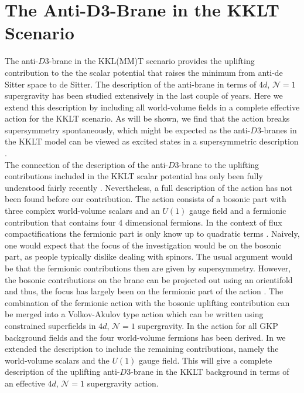 \documentclass[a4paper,12pt,twoside,openright]{report}
\begin{document}
\section[The Anti-$D3$-Brane in the KKLT Scenario]{The Anti-$\mathbf{D3}$-Brane in the KKLT Scenario}
\label{sec:D3barKKLTmain}
The anti-$D3$-brane in the KKL(MM)T scenario \cite{Kachru:2003aw,Kachru:2003sx} provides the uplifting contribution to the the scalar potential that raises the minimum from anti-de Sitter space to de Sitter. The description of the anti-brane in terms of $4d$, $\mathcal{N}=1$ supergravity has been studied extensively in the last couple of years. Here we extend this description by including all world-volume fields in a complete effective action for the KKLT scenario. As will be shown, we find that the action breaks supersymmetry spontaneously, which might be expected as the anti-$D3$-branes in the KKLT model can be viewed as excited states in a supersymmetric description \cite{Kachru:2002gs}.\\
The connection of the description of the anti-$D3$-brane to the uplifting contributions included in the KKLT scalar potential has only been fully understood fairly recently \cite{Ferrara:2014kva,Kallosh:2014wsa,Bergshoeff:2015jxa,Kallosh:2015nia,Garcia-Etxebarria:2015lif}. Nevertheless, a full description of the action has not been found before our contribution. The action consists of a bosonic part with three complex world-volume scalars and an $U(1)$ gauge field and a fermionic contribution that contains four 4 dimensional fermions. In the context of flux compactifications the fermionic part is only know up to quadratic terms \cite{Grana:2002tu,Grana:2003ek,Marolf:2003ye,Tripathy:2005hv,Martucci:2005rb,Bergshoeff:2013pia}. Naively, one would expect that the focus of the investigation would be on the bosonic part, as people typically dislike dealing with spinors. The usual argument would be that the fermionic contributions then are given by supersymmetry. However, the bosonic contributions on the brane can be projected  out using an orientifold and thus, the focus has largely been on the fermionic part of the action \cite{Kallosh:2014wsa,Bergshoeff:2015jxa,Kallosh:2015nia,Garcia-Etxebarria:2015lif,Dasgupta:2016prs,GarciadelMoral:2017vnz}. The combination of the fermionic action with the bosonic uplifting contribution can be merged into a Volkov-Akulov type action \cite{Volkov:1973ix} which can be written using constrained superfields in $4d$, $\mathcal{N}=1$ supergravity. In \cite{GarciadelMoral:2017vnz} the action for all GKP background fields and the four world-volume fermions has been derived. In \cite{Cribiori:2019hod} we extended the description to include the remaining contributions, namely the world-volume scalars and the $U(1)$ gauge field. This will give a complete description of the uplifting anti-$D3$-brane in the KKLT background in terms of an effective $4d$, $\mathcal{N}=1$ supergravity action.
\end{document}
